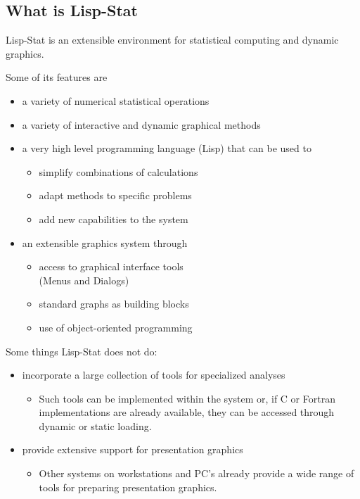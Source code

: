 \begin{slide}{}
\section{What is Lisp-Stat}
Lisp-Stat is an extensible environment for statistical computing and
dynamic graphics.

Some of its features are
\begin{itemize}
\item
a variety of numerical statistical operations
\item
a variety of interactive and dynamic graphical methods
\item 
a very high level programming language (Lisp) that can be used to
\begin{itemize}
\item simplify combinations of calculations
\item adapt methods to specific problems
\item add new capabilities to the system
\end{itemize}
\item
an extensible graphics system through
\begin{itemize}
\item access to graphical interface tools\\(Menus and Dialogs)
\item standard graphs as building blocks
\item use of object-oriented programming
\end{itemize}
\end{itemize}
\end{slide}

\begin{slide}{}
Some things Lisp-Stat does not do:
\begin{itemize}
\item
incorporate a large collection of tools for specialized analyses
\begin{itemize}
\item[]
Such tools can be implemented within the system or, if C or Fortran
implementations are already available, they can be accessed through
dynamic or static loading.
\end{itemize}
\item
provide extensive support for presentation graphics
\begin{itemize}
\item[]
Other systems on workstations and PC's already provide a wide range of
tools for preparing presentation graphics.
\end{itemize}
\end{itemize}
\end{slide}

